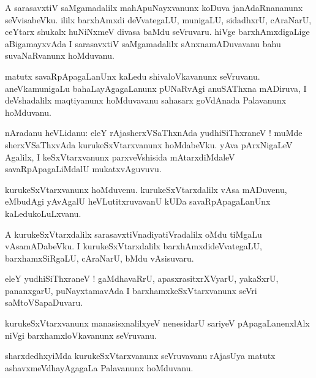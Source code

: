 \documentclass{article}
\begin{document}
\begin{mn}
A sarasavxtiV saMgamadalilx mahApuNayxvanunx koDuva janAdaRnananunx seVvisabeVku. ililx 
barxhAmxdi deVvategaLU, munigaLU, sidadhxrU, cAraNarU, ceYtarx shukalx huNiNxmeV divasa baMdu
seVruvaru. hiVge barxhAmxdigaLige aBigamayxvAda I sarasavxtiV saMgamadalilx sAnxnamADuvavanu bahu 
suvaNaRvanunx hoMduvanu.
\end{mn}

\begin{mn}
matutx savaRpApagaLanUnx kaLedu shivaloVkavanunx seVruvanu. aneVkamunigaLu bahaLayAgagaLanunx 
pUNaRvAgi anuSAThxna mADiruva, I deVshadalilx maqtiyanunx hoMduvavanu sahasarx goVdAnada 
Palavanunx hoMduvanu.
\end{mn}


\begin{mn}
nAradanu heVLidanu: eleY rAjasherxVSaThxnAda yudhiSiThxraneV ! muMde sherxVSaThxvAda 
kurukeSxVtarxvanunx hoMdabeVku. yAva pArxNigaLeV Agalilx, I keSxVtarxvanunx parxveVshisida 
mAtarxdiMdaleV savaRpApagaLiMdalU mukatxvAguvuvu.
\end{mn}

\begin{mn}
kurukeSxVtarxvanunx  hoMduvenu. kurukeSxVtarxdalilx vAsa mADuvenu, eMbudAgi yAvAgalU 
heVLutitxruvavanU kUDa savaRpApagaLanUnx kaLedukoLuLxvanu.
\end{mn}

\begin{mn}
A kurukeSxVtarxdalilx sarasavxtiVnadiyatiVradalilx oMdu tiMgaLu vAsamADabeVku. I 
kurukeSxVtarxdalilx barxhAmxdideVvategaLU, barxhamxSiRgaLU, cAraNarU, bMdu vAsisuvaru. 
\end{mn}

\begin{mn}
eleY yudhiSiThxraneV ! gaMdhavaRrU, apasxrasitxrXVyarU, yakaSxrU, pananxgarU, puNayxtamavAda I 
barxhamxkeSxVtarxvanunx seVri saMtoVSapaDuvaru.
\end{mn}

\begin{mn}
kurukeSxVtarxvanunx manasisxnalilxyeV nenesidarU sariyeV pApagaLanenxlAlx niVgi 
barxhamxloVkavanunx seVruvanu.
\end{mn}

\begin{mn}
sharxdedhxyiMda kurukeSxVtarxvanunx seVruvavanu rAjasUya matutx ashavxmeVdhayAgagaLa Palavanunx 
hoMduvanu.
\end{mn}
\end{document}
